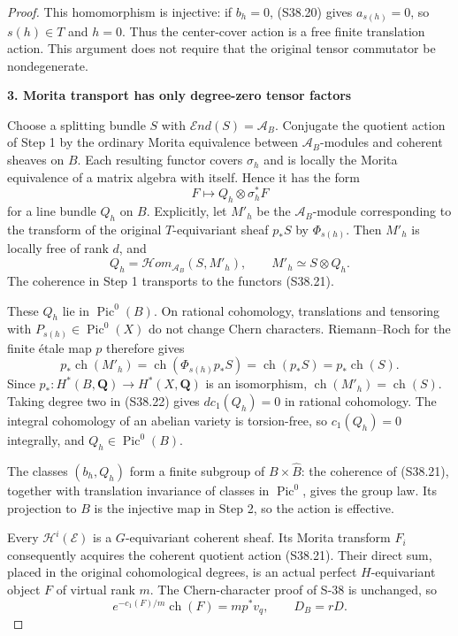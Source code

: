\documentclass[11pt,a4paper]{article}
\theoremstyle{definition}
\begin{document}
\begin{proof}
This homomorphism is injective: if \(b_h=0\), (S38.20) gives \(a_{s(h)}=0\), so \(s(h)\in T\) and \(h=0\). Thus the center-cover action is a free finite translation action. This argument does not require that the original tensor commutator be nondegenerate.

\par

\medskip\noindent\textbf{3. Morita transport has only degree-zero tensor factors}\quad

Choose a splitting bundle \(S\) with \(\mathcal End(S)=\mathscr A_B\). Conjugate the quotient action of Step 1 by the ordinary Morita equivalence between \(\mathscr A_B\)-modules and coherent sheaves on \(B\). Each resulting functor covers \(\sigma_h\) and is locally the Morita equivalence of a matrix algebra with itself. Hence it has the form \[
 F\longmapsto Q_h\otimes\sigma_h^*F
 \tag{S38.21}
\] for a line bundle \(Q_h\) on \(B\). Explicitly, let \(M'_h\) be the \(\mathscr A_B\)-module corresponding to the transform of the original \(T\)-equivariant sheaf \(p_*S\) by \(\Phi_{s(h)}\). Then \(M'_h\) is locally free of rank \(d\), and \[
 Q_h=\mathcal Hom_{\mathscr A_B}(S,M'_h),\qquad
 M'_h\simeq S\otimes Q_h.
 \tag{S38.22}
\] The coherence in Step 1 transports to the functors (S38.21).

These \(Q_h\) lie in \(\operatorname{Pic}^0(B)\). On rational cohomology, translations and tensoring with \(P_{s(h)}\in\operatorname{Pic}^0(X)\) do not change Chern characters. Riemann--Roch for the finite étale map \(p\) therefore gives \[
 p_*\operatorname{ch}(M'_h)
 =\operatorname{ch}(\Phi_{s(h)}p_*S)
 =\operatorname{ch}(p_*S)
 =p_*\operatorname{ch}(S).
\] Since \(p_*:H^*(B,\mathbf Q)\to H^*(X,\mathbf Q)\) is an isomorphism, \(\operatorname{ch}(M'_h)=\operatorname{ch}(S)\). Taking degree two in (S38.22) gives \(d c_1(Q_h)=0\) in rational cohomology. The integral cohomology of an abelian variety is torsion-free, so \(c_1(Q_h)=0\) integrally, and \(Q_h\in\operatorname{Pic}^0(B)\).

The classes \((b_h,Q_h)\) form a finite subgroup of \(B\times\widehat B\): the coherence of (S38.21), together with translation invariance of classes in \(\operatorname{Pic}^0\), gives the group law. Its projection to \(B\) is the injective map in Step 2, so the action is effective.

Every \(\mathcal H^i(\mathcal E)\) is a \(G\)-equivariant coherent sheaf. Its Morita transform \(F_i\) consequently acquires the coherent quotient action (S38.21). Their direct sum, placed in the original cohomological degrees, is an actual perfect \(H\)-equivariant object \(F\) of virtual rank \(m\). The Chern-character proof of S-38 is unchanged, so \[
 e^{-c_1(F)/m}\operatorname{ch}(F)=m p^*v_q,
 \qquad D_B=rD.
 \tag{S38.23}
\]


\end{proof}
\end{document}
